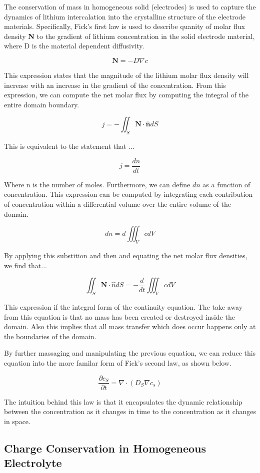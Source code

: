 \documentclass[lettersize,journal]{IEEEtran}
\begin{document}
The conservation of mass in homogeneous solid (electrodes) is used to capture the dynamics of lithium intercalation into the crystalline structure of the electrode materials. Specifically, Fick's first law is used to describe quanity of molar flux density \textbf{N} to the gradient of lithium concentration in the solid electrode material, where D is the material dependent diffusivity.

\[
\textbf{N} =  -D \nabla c
\]

This expression states that the magnitude of the lithium molar flux density will increase with an increase in the gradient of the concentration. From this expression, we can compute the net molar flux by computing the integral of the entire domain boundary.

\[
 j = -\iint_{S} \textbf{N} \cdot \hat{\textbf{n}}dS
\]

This is equivalent to the statement that ...

\[
j = \frac{dn}{dt}
\]

Where n is the number of moles. Furthermore, we can define $dn$ as a function of concentration. This expression can be computed by integrating each contribution of concentration within a differential volume over the entire volume of the domain.

\[
dn = d \iiint_V cdV
\]

By applying this substition and then and equating the net molar flux densities, we find that...

\[
\iint_S \textbf{N} \cdot \hat{n}dS = -\frac{d}{dt} \iiint_V c dV
\]

This expression if the integral form of the continuity equation. The take away from this equation is that no mass has been created or destroyed inside the domain. Also this implies that all mass transfer which does occur happens only at the boundaries of the domain.

By further massaging and manipulating the previous equation, we can reduce this equation into the more familar form of Fick's second law, as shown below.

\[
\frac{\partial c_{S}}{\partial t} = \nabla \cdot \left( D_{S} \nabla c_{s} \right)
\]

The intuition behind this law is that it encapsulates the dynamic relationship between the concentration as it changes in time to the concentration as it changes in space.


\subsection{Charge Conservation in Homogeneous Electrolyte}
\end{document}
